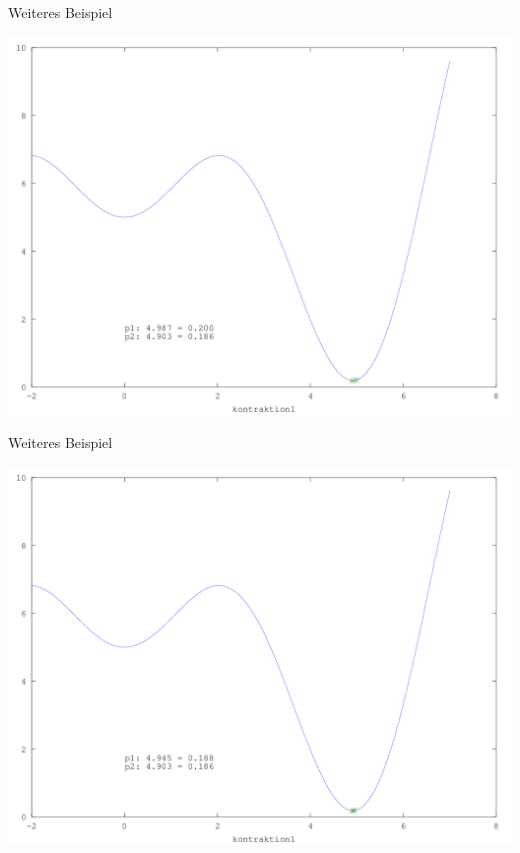 \documentclass[\outputformat]{beamer}
\begin{document}
\begin{frame}{Weiteres Beispiel}
	\begin{center}
		\includegraphics[height=0.75\paperheight]{../bilder/GlobMinima/sinx_x009.png}
	\end{center}
\end{frame}
\begin{frame}{Weiteres Beispiel}
	\begin{center}
		\includegraphics[height=0.75\paperheight]{../bilder/GlobMinima/sinx_x010.png}
	\end{center}
\end{frame}
\end{document}
